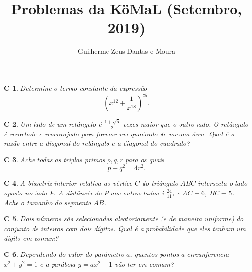 \documentclass[12pt,a4paper]{scrartcl}
\title{Problemas da KöMaL (Setembro, 2019)}
\author{Guilherme Zeus Dantas e Moura}
\theoremstyle{wonamestylealt}
\newtheorem{probc}{C}
\begin{document}
	

	\sloppy
	\setcounter{probc}{1552}
	\begin{probc}
		Determine o termo constante da expressão \[
			\left(x^{12} + \frac{1}{x^{18}}\right)^{25}.
		\]
	\end{probc}

	\begin{probc}
		Um lado de um retângulo é \(\frac{1+\sqrt{5}}{2}\) vezes maior que o outro lado. O retângulo é recortado e rearranjado para formar um quadrado de mesma área. Qual é a razão entre a diagonal do retângulo e a diagonal do quadrado? 
	\end{probc}

	\begin{probc}
		Ache todas as triplas primos \(p, q, r\) para os quais \[
			p + q^2 = 4r^2.
		\]
	\end{probc}

	\begin{probc}
		A bissetriz interior relativa ao vértice \(C\) do triângulo \(ABC\) intersecta o lado oposto no lado \(P\). A distância de \(P\) aos outros lados é \(\frac{24}{11}\), e \(AC = 6\), \(BC = 5\). Ache o tamanho do segmento \(AB\).
	\end{probc}

	\begin{probc}
		Dois números são selecionados aleatoriamente (e de maneira uniforme) do conjunto de inteiros com dois dígitos. Qual é a probabilidade que eles tenham um dígito em comum?
	\end{probc}

	\begin{probc}
		Dependendo do valor do parâmetro \(a\), quantos pontos a circunferência \(x^2 + y^2 = 1\) e a parábola \(y = ax^2 - 1\) vão ter em comum?
	\end{probc}
\end{document}
